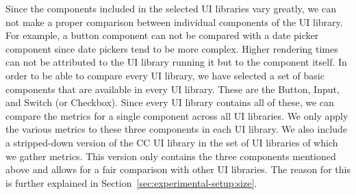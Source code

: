 Since the components included in the selected UI libraries vary greatly, we can not make a proper comparison between individual components of the UI library. For example, a button component can not be compared with a date picker component since date pickers tend to be more complex. Higher rendering times can not be attributed to the UI library running it but to the component itself. In order to be able to compare every UI library, we have selected a set of basic components that are available in every UI library. These are the Button, Input, and Switch (or Checkbox). Since every UI library contains all of these, we can compare the metrics for a single component across all UI libraries. We only apply the various metrics to these three components in each UI library. We also include a stripped-down version of the CC UI library in the set of UI libraries of which we gather metrics. This version only contains the three components mentioned above and allows for a fair comparison with other UI libraries. The reason for this is further explained in Section~\ref{sec:experimental-setup:size}.


